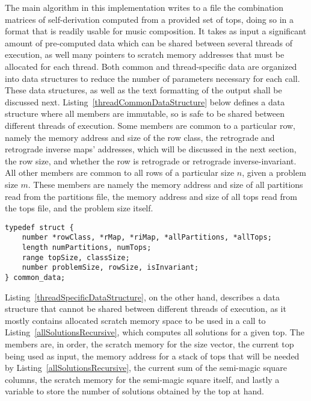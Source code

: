 The main algorithm in this implementation writes to a file the combination matrices of self-derivation computed from a provided set of tops, doing so in a format that is readily usable for music composition. It takes as input a significant amount of pre-computed data which can be shared between several threads of execution, as well many pointers to scratch memory addresses that must be allocated for each thread. Both common and thread-specific data are organized into data structures to reduce the number of parameters necessary for each call. These data structures, as well as the text formatting of the output shall be discussed next. Listing~\ref{threadCommonDataStructure} below defines a data structure where all members are immutable, so is safe to be shared between different threads of execution. Some members are common to a particular row, namely the memory address and size of the row class, the retrograde and retrograde inverse maps' addresses, which will be discussed in the next section, the row size, and whether the row is retrograde or retrograde inverse-invariant. All other members are common to all rows of a particular size $n$, given a problem size $m$. These members are namely the memory address and size of all partitions read from the partitions file, the memory address and size of all tops read from the tops file, and the problem size itself.

\begin{lstlisting}[caption={Defining a data structure to hold thread-common data.},label={threadCommonDataStructure}]
typedef struct {
    number *rowClass, *rMap, *riMap, *allPartitions, *allTops;
    length numPartitions, numTops;
    range topSize, classSize;
    number problemSize, rowSize, isInvariant;
} common_data;
\end{lstlisting}

Listing~\ref{threadSpecificDataStructure}, on the other hand, describes a data structure that cannot be shared between different threads of execution, as it mostly contains allocated scratch memory space to be used in a call to Listing~\ref{allSolutionsRecursive}, which computes all solutions for a given top. The members are, in order, the scratch memory for the size vector, the current top being used as input, the memory address for a stack of tops that will be needed by Listing~\ref{allSolutionsRecursive}, the current sum of the semi-magic square columns, the scratch memory for the semi-magic square itself, and lastly a variable to store the number of solutions obtained by the top at hand.

